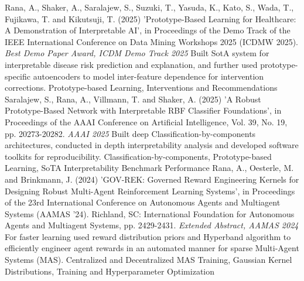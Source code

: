 \begin{projects}
    \project
	{Rana, A., Shaker, A., Saralajew, S., Suzuki, T., Yasuda, K., Kato, S., Wada, T., Fujikawa, T. and Kikutsuji, T. (2025) 'Prototype-Based Learning for Healthcare: A Demonstration of Interpretable AI', in Proceedings of the Demo Track of the IEEE International Conference on Data Mining Workshops 2025 (ICDMW 2025).}{ \textit{Best Demo Paper Award, ICDM Demo Track 2025}}
	{
    }
	{Built SotA system for interpretable disease risk prediction and explanation, and further used prototype-specific autoencoders to model inter-feature dependence for intervention corrections.}
    {Prototype-based Learning, Interventions and Recommendations}
	\project
	{Saralajew, S., Rana, A., Villmann, T. and Shaker, A. (2025) 'A Robust Prototype-Based Network with Interpretable RBF Classifier Foundations', in Proceedings of the AAAI Conference on Artificial Intelligence, Vol. 39, No. 19, pp. 20273-20282.}{ \textit{AAAI 2025}}
	{
	}
	{Built deep Classification-by-components architectures, conducted in depth interpretability analysis and developed software toolkits for reproducibility.}
    {Classification-by-components, Prototype-based Learning, SoTA Interpretability Benchmark Performance}
	\project
	{Rana, A., Oesterle, M. and Brinkmann, J. (2024) 'GOV-REK: Governed Reward Engineering Kernels for Designing Robust Multi-Agent Reinforcement Learning Systems', in Proceedings of the 23rd International Conference on Autonomous Agents and Multiagent Systems (AAMAS '24). Richland, SC: International Foundation for Autonomous Agents and Multiagent Systems, pp. 2429-2431.}{ \textit{Extended Abstract, AAMAS 2024} }
	{
	}
	{For faster learning used reward distribution priors and Hyperband algorithm to efficiently engineer agent rewards in an automated manner for sparse Multi-Agent Systems (MAS).}
	{Centralized and Decentralized MAS Training, Gaussian Kernel Distributions, Training and Hyperparameter Optimization}

\end{projects}
